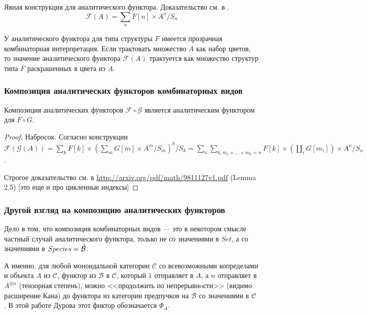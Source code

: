 Явная конструкция для аналитического функтора. Доказательство см. в
\cite{BergTrees}.
\begin{equation}
\label{eq:an}
	\mathcal F(A) = \sum\limits_n F[n] \times A^n / S_n
\end{equation}

\begin{remark}
\label{rem:color}
У аналитического функтора для типа структуры $F$ имеется прозрачная
комбинаторная интерпретация.
Если трактовать множество $A$ как набор цветов,
то значение аналитического функтора $\mathcal F(A)$ трактуется как множество структур типа $F$
раскрашенных в цвета из $A$.
\end{remark}

\subsubsection{Композиция аналитических функторов комбинаторных видов}
\begin{theorem}
Композиция аналитических функторов $\mathcal F \circ \mathcal G$ является
аналитическим функтором для $F \circ G$.
\end{theorem}
\begin{proof}
Набросок. Согласно конструкции $\mathcal F(\mathcal
G (A)) = \sum\limits_k F[k] \times (\sum\limits_m G[m] \times A^m / S_m)^k /
S_k = \sum\limits_n \sum\limits_{k, m_1 + \dots + m_k = n} F[k] \times
(\coprod\limits_{i} G[m_i]) \times A^n / S_n$.

Строгое доказательство см. в \url{http://arxiv.org/pdf/math/9811127v1.pdf}
(Lemma 2.5) [это еще и про цикленные индексы]
\end{proof}

\subsubsection{Другой взгляд на композицию аналитических функторов}
Дело в том, что композиция комбинаторных видов --- это в некотором смысле
частный случай аналитического функтора, только не со значениями в $Set$,
а со значениями в $Species = \Hat {\mathcal B}$.

А именно, для любой моноидальной категории $\mathcal C$ со всевозможными
копределами и объекта $A$ из $\mathcal C$, функтор из $\mathcal B$ в $\mathcal
C$, который $1$ отправляет в $A$, а $n$ отправляет в $A^{\otimes n}$ (тензорная
степень), можно <<продолжить по непрерывнoсти>> (видимо расширение Кана) до
функтора из категории предпучков на $\mathcal B$ со значениями в $\mathcal C$
\cite{Durov}. В этой работе Дурова этот фнктор обозначается $\Phi_A$.


